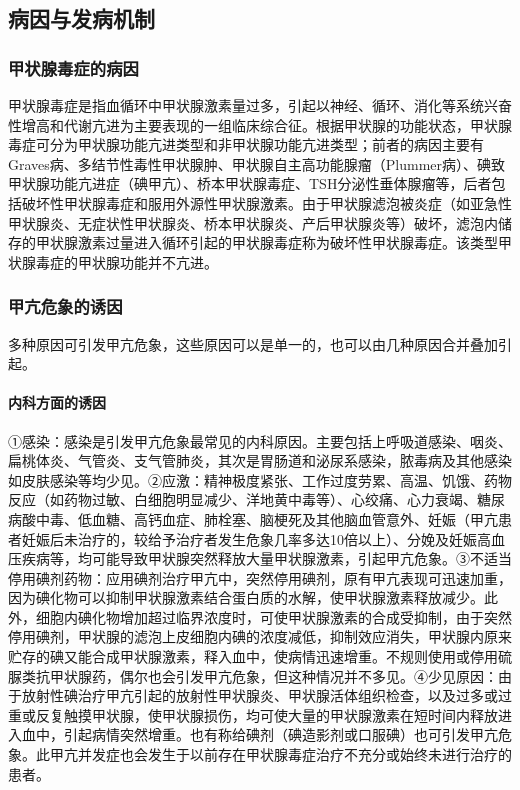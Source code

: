 \subsection{病因与发病机制}

\subsubsection{甲状腺毒症的病因}

甲状腺毒症是指血循环中甲状腺激素量过多，引起以神经、循环、消化等系统兴奋性增高和代谢亢进为主要表现的一组临床综合征。根据甲状腺的功能状态，甲状腺毒症可分为甲状腺功能亢进类型和非甲状腺功能亢进类型；前者的病因主要有Graves病、多结节性毒性甲状腺肿、甲状腺自主高功能腺瘤（Plummer病）、碘致甲状腺功能亢进症（碘甲亢）、桥本甲状腺毒症、TSH分泌性垂体腺瘤等，后者包括破坏性甲状腺毒症和服用外源性甲状腺激素。由于甲状腺滤泡被炎症（如亚急性甲状腺炎、无症状性甲状腺炎、桥本甲状腺炎、产后甲状腺炎等）破坏，滤泡内储存的甲状腺激素过量进入循环引起的甲状腺毒症称为破坏性甲状腺毒症。该类型甲状腺毒症的甲状腺功能并不亢进。

\subsubsection{甲亢危象的诱因}

多种原因可引发甲亢危象，这些原因可以是单一的，也可以由几种原因合并叠加引起。

\paragraph{内科方面的诱因}

①感染：感染是引发甲亢危象最常见的内科原因。主要包括上呼吸道感染、咽炎、扁桃体炎、气管炎、支气管肺炎，其次是胃肠道和泌尿系感染，脓毒病及其他感染如皮肤感染等均少见。②应激：精神极度紧张、工作过度劳累、高温、饥饿、药物反应（如药物过敏、白细胞明显减少、洋地黄中毒等）、心绞痛、心力衰竭、糖尿病酸中毒、低血糖、高钙血症、肺栓塞、脑梗死及其他脑血管意外、妊娠（甲亢患者妊娠后未治疗的，较给予治疗者发生危象几率多达10倍以上）、分娩及妊娠高血压疾病等，均可能导致甲状腺突然释放大量甲状腺激素，引起甲亢危象。③不适当停用碘剂药物：应用碘剂治疗甲亢中，突然停用碘剂，原有甲亢表现可迅速加重，因为碘化物可以抑制甲状腺激素结合蛋白质的水解，使甲状腺激素释放减少。此外，细胞内碘化物增加超过临界浓度时，可使甲状腺激素的合成受抑制，由于突然停用碘剂，甲状腺的滤泡上皮细胞内碘的浓度减低，抑制效应消失，甲状腺内原来贮存的碘又能合成甲状腺激素，释入血中，使病情迅速增重。不规则使用或停用硫脲类抗甲状腺药，偶尔也会引发甲亢危象，但这种情况并不多见。④少见原因：由于放射性碘治疗甲亢引起的放射性甲状腺炎、甲状腺活体组织检查，以及过多或过重或反复触摸甲状腺，使甲状腺损伤，均可使大量的甲状腺激素在短时间内释放进入血中，引起病情突然增重。也有称给碘剂（碘造影剂或口服碘）也可引发甲亢危象。此甲亢并发症也会发生于以前存在甲状腺毒症治疗不充分或始终未进行治疗的患者。

